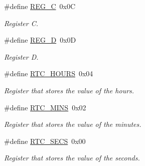 \begin{DoxyCompactItemize}
\mbox{\label{group___r_t_c___macros_ga088e580de0961d5f30eb3366f97b324c}} 
\#define \hyperlink{group___r_t_c___macros_ga088e580de0961d5f30eb3366f97b324c}{R\+E\+G\+\_\+C}~0x0C
\begin{DoxyCompactList}\small\item\em Register C. \end{DoxyCompactList}\item 
\mbox{\label{group___r_t_c___macros_ga8f2a2da8b96e20112d3f225636392424}} 
\#define \hyperlink{group___r_t_c___macros_ga8f2a2da8b96e20112d3f225636392424}{R\+E\+G\+\_\+D}~0x0D
\begin{DoxyCompactList}\small\item\em Register D. \end{DoxyCompactList}\item 
\mbox{\label{group___r_t_c___macros_ga4d74cdb9a956c4f1783ad5aff00dc2b8}} 
\#define \hyperlink{group___r_t_c___macros_ga4d74cdb9a956c4f1783ad5aff00dc2b8}{R\+T\+C\+\_\+\+H\+O\+U\+RS}~0x04
\begin{DoxyCompactList}\small\item\em Register that stores the value of the hours. \end{DoxyCompactList}\item 
\mbox{\label{group___r_t_c___macros_ga1bad17ef559ad960bba47fe87643b4c7}} 
\#define \hyperlink{group___r_t_c___macros_ga1bad17ef559ad960bba47fe87643b4c7}{R\+T\+C\+\_\+\+M\+I\+NS}~0x02
\begin{DoxyCompactList}\small\item\em Register that stores the value of the minutes. \end{DoxyCompactList}\item 
\mbox{\label{group___r_t_c___macros_gaa86f159915dace411e5a7b74ecc130bd}} 
\#define \hyperlink{group___r_t_c___macros_gaa86f159915dace411e5a7b74ecc130bd}{R\+T\+C\+\_\+\+S\+E\+CS}~0x00
\begin{DoxyCompactList}\small\item\em Register that stores the value of the seconds. \end{DoxyCompactList}\item 
\mbox{\label{group___r_t_c___macros_ga8608b390793bacadc72dc418766b928b}} 

\end{DoxyCompactItemize}
